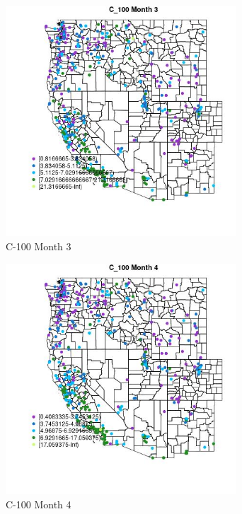 \begin{figure} 
\centering  
\includegraphics[width=0.77\textwidth]{Code_Outputs/ML_input_report_ML_input_PM25_Step5_part_d_de_duplicated_aves_ML_input_MapObsMo3C_100.jpg} 
\caption{\label{fig:ML_input_report_ML_input_PM25_Step5_part_d_de_duplicated_aves_ML_inputMapObsMo3C_100}C-100 Month 3} 
\end{figure} 
 

\begin{figure} 
\centering  
\includegraphics[width=0.77\textwidth]{Code_Outputs/ML_input_report_ML_input_PM25_Step5_part_d_de_duplicated_aves_ML_input_MapObsMo4C_100.jpg} 
\caption{\label{fig:ML_input_report_ML_input_PM25_Step5_part_d_de_duplicated_aves_ML_inputMapObsMo4C_100}C-100 Month 4} 
\end{figure} 
 


